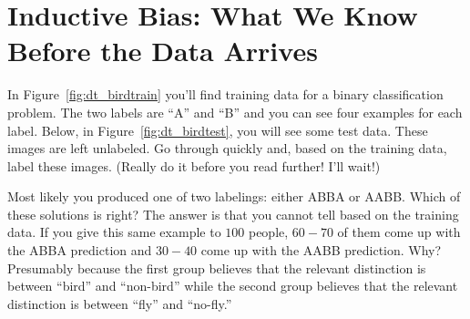 

\section{Inductive Bias: What We Know Before the Data Arrives}
\MoveNextFigure{-5cm}


In Figure~\ref{fig:dt_birdtrain} you'll find training data for a binary
classification problem.  The two labels are ``A'' and ``B'' and you
can see four examples for each label.  Below, in
Figure~\ref{fig:dt_birdtest}, you will see some test data.  These
images are left unlabeled.  Go through quickly and, based on the
training data, label these images.  (Really do it before you read
further!  I'll wait!)

Most likely you produced one of two labelings: either ABBA or AABB. Which of these solutions is right?
The answer is that you cannot tell based on the training data.  If you
give this same example to $100$ people, $60-70$ of them come up with
the ABBA prediction and $30-40$ come up with the AABB prediction.
Why?  Presumably because the first group believes
that the relevant distinction is between ``bird'' and ``non-bird''
while the second group believes that the relevant distinction is
between ``fly'' and ``no-fly.''

